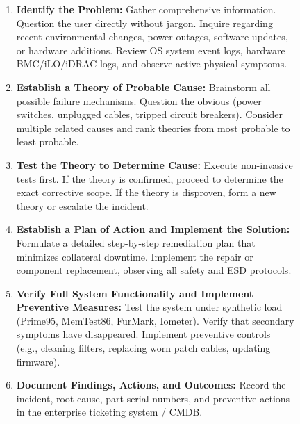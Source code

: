 \begin{figure}[H]
\centering
\begin{tcolorbox}[colback=white,colframe=navyblue,title=\textbf{Standard Six-Step IT/Hardware Troubleshooting Framework}]
\begin{enumerate}[leftmargin=*]
    \item \textbf{Identify the Problem:} Gather comprehensive information. Question the user directly without jargon. Inquire regarding recent environmental changes, power outages, software updates, or hardware additions. Review OS system event logs, hardware BMC/iLO/iDRAC logs, and observe active physical symptoms.
    \item \textbf{Establish a Theory of Probable Cause:} Brainstorm all possible failure mechanisms. Question the obvious (power switches, unplugged cables, tripped circuit breakers). Consider multiple related causes and rank theories from most probable to least probable.
    \item \textbf{Test the Theory to Determine Cause:} Execute non-invasive tests first. If the theory is confirmed, proceed to determine the exact corrective scope. If the theory is disproven, form a new theory or escalate the incident.
    \item \textbf{Establish a Plan of Action and Implement the Solution:} Formulate a detailed step-by-step remediation plan that minimizes collateral downtime. Implement the repair or component replacement, observing all safety and ESD protocols.
    \item \textbf{Verify Full System Functionality and Implement Preventive Measures:} Test the system under synthetic load (Prime95, MemTest86, FurMark, Iometer). Verify that secondary symptoms have disappeared. Implement preventive controls (e.g., cleaning filters, replacing worn patch cables, updating firmware).
    \item \textbf{Document Findings, Actions, and Outcomes:} Record the incident, root cause, part serial numbers, and preventive actions in the enterprise ticketing system / CMDB.
\end{enumerate}
\end{tcolorbox}
\end{figure}

